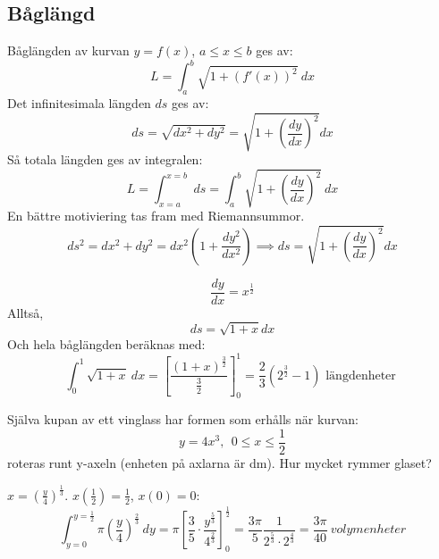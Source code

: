 \documentclass{report}
\begin{document}
\subsection{Båglängd}
{
Båglängden av kurvan $ y = f(x) $, $ a \le x \le b $ ges av:
\begin{equation*}
L = \int_{a}^{b} \sqrt{1 + (f'(x))^2}  \: dx 
\end{equation*}
Det infinitesimala längden $ ds $ ges av:
\begin{equation*}
ds = \sqrt{dx^2 + dy^2} = \sqrt{1 + ( \frac{dy}{dx}  )^2} dx
\end{equation*}
Så totala längden ges av integralen:
\begin{equation*}
L = \int_{x=a}^{x=b} \: ds = \int_{a}^{b} \sqrt{1 + ( \frac{dy}{dx} )^2}  \: dx  
\end{equation*}
En bättre motiviering tas fram med Riemannsummor. 
\begin{equation*}
ds^2 = dx^2 + dy^2 = dx^2(1 + \frac{dy^2}{dx^2} ) \implies ds = \sqrt{1 + ( \frac{dy}{dx}  )^2} dx 
\end{equation*}
}

{
\begin{equation*}
	\frac{dy}{dx} = x^{ \frac{1}{2} } 
\end{equation*}
Alltså,
\begin{equation*}
ds = \sqrt{1 + x} dx
\end{equation*}
Och hela båglängden beräknas med:
\begin{equation*}
	\int_{0}^{1} \sqrt{1+x}  \: dx = [ \frac{(1+x)^{ \frac{3}{2}  }}{ \frac{3}{2}  }  ]_{0}^{1}  = \frac{2}{3} (2^ { \frac{3}{2}} - 1) \text{ längdenheter }  
\end{equation*}
}

\qs{}
{
Själva kupan av ett vinglass har formen som erhålls när kurvan:
\begin{equation*}
y = 4x^3,\:\: 0 \le x \le \frac{1}{2}  
\end{equation*}
roteras runt y-axeln (enheten på axlarna är dm). Hur mycket rymmer glaset?
}

\sol $ x = (\frac{y}{4})^{ \frac{1}{3}  }  $. $ x( \frac{1}{2} ) = \frac{1}{2}  $, $ x(0) = 0 $:
\begin{equation*}
\int_{y=0}^{y= \frac{1}{2}  } \pi ( \frac{y}{4} )^{ \frac{2}{3}  } \: dy = \pi[ \frac{3}{5} \cdot  \frac{y^ { \frac{5}{3}  }}{4^{ \frac{2}{3}  } }  ]_{0}^{ \frac{1}{2} } = \frac{3\pi}{5} \frac{1}{2^{ \frac{5}{3} } \cdot 2^{ \frac{4}{3}  }} = \frac{3\pi}{40} \: volymenheter      
\end{equation*}
\end{document}
